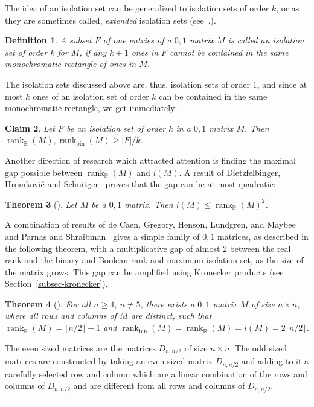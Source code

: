 \documentclass[11pt]{article}
\newtheorem{theorem}{Theorem}
\newtheorem{definition}[theorem]{Definition}
\newtheorem{claim}[theorem]{Claim}
\newcommand{\qedsymb}{\hfill{\rule{2mm}{2mm}}}
\renewenvironment{proof}[1][]{\begin{trivlist}
\item[\hspace{\labelsep}{\bf\noindent Proof#1:\/}] }{\qedsymb\end{trivlist}}
\newcommand{\rank}{\mathop{\mathrm{rank}}}
\newcommand{\Rbool}{{\rank}_\mathbb{B}}
\newcommand{\Rbin}{{\rank}_{\mathrm{bin}}}
\newcommand{\Rreal}{{\rank}_\mathbb{R}}
\begin{document}
The idea of an isolation set can be generalized to isolation sets of order $k$, or as they are sometimes called, {\em extended} isolation sets (see~\cite{dietzfelbinger1996comparison},\cite{orlitsky1988communication}).

\begin{definition}
A subset $F$ of one entries of a $0,1$ matrix $M$ is called an {\em isolation set of order $k$} for $M$, if any $k+1$ ones in $F$ cannot be contained in the same monochromatic rectangle of ones in $M$.
\end{definition}

The isolation sets discussed above are, thus, isolation sets of order $1$, and since at most $k$ ones of an isolation set of order $k$ can be contained in the same monochromatic rectangle, we get immediately:

\begin{claim}
Let $F$ be an isolation set of order $k$ in a $0,1$ matrix $M$. Then $\Rbool(M), \Rbin(M) \geq |F| /k$.
\end{claim}

Another direction of research which attracted attention is finding the maximal gap possible between $\Rreal(M)$ and  $i(M)$.
A result of Dietzfelbinger, Hromkovi{\v{c}} and Schnitger~\cite{dietzfelbinger1996comparison} proves that the gap can be at most quadratic:

\begin{theorem}[\cite{dietzfelbinger1996comparison}]
Let $M$ be a $0,1$ matrix. Then  $i(M) \leq \Rreal(M)^2$.
\end{theorem}

A combination of results of de Caen, Gregory, Henson, Lundgren, and Maybee~\cite{realnonnegative} and Parnas and Shraibman~\cite{parnas2025study}
gives a simple family of $0,1$ matrices, as described in the following theorem,
with a multiplicative gap of almost $2$ between the real rank and the binary and Boolean rank and maximum isolation set, as the size of the matrix grows.
This gap can be amplified using Kronecker products (see Section~\ref{subsec-kronecker}).

\begin{theorem}[\cite{realnonnegative,parnas2025study}]
\label{theodoublegap}
For all $n \geq 4$, $n \neq 5$, there exists a $0,1$ matrix $M$ of size $n \times n$, where all rows and columns of $M$ are distinct,
such that $\Rreal(M) = \lfloor n/2\rfloor + 1$ and $\Rbin(M) = \Rbool(M) = i(M) = 2\lfloor n/2\rfloor$.
\end{theorem}
\begin{proof}
The even sized matrices are the matrices $D_{n,n/2}$ of size $n \times n$.
The odd sized matrices are constructed by taking an even sized matrix $D_{n,n/2}$ and adding to it a carefully selected row and column
which are a linear combination of the rows and columns of $D_{n,n/2}$ and are different from all rows and columns of $D_{n,n/2}$.
\end{proof}
\end{document}
